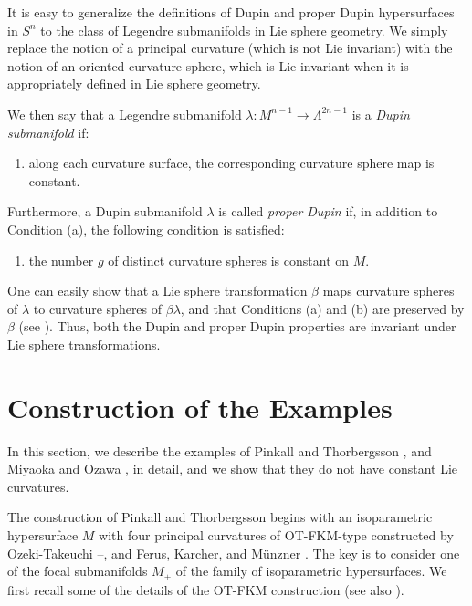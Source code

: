 \documentclass[12pt]{article}
\begin{document}
It is easy to generalize the definitions of Dupin and proper Dupin hypersurfaces in $S^n$ to the class of Legendre submanifolds in Lie sphere geometry.  We simply replace the notion of a principal curvature (which is not Lie invariant)
with the notion of an oriented curvature sphere, which is Lie invariant when it is appropriately defined in Lie sphere geometry.

We then say that a Legendre submanifold $\lambda: M^{n-1} \rightarrow \Lambda^{2n-1}$
is a {\em Dupin submanifold} if:


\begin{enumerate}
\item[(a)] along each curvature surface, the corresponding
curvature sphere map is constant.
\end{enumerate}
Furthermore, a Dupin submanifold $\lambda$ is called {\em proper Dupin} if, in addition 
to Condition (a), the following condition is satisfied:

\begin{enumerate}
\item[(b)] the number $g$ of distinct curvature spheres is constant on $M$.
\end{enumerate}

One can easily show that a Lie sphere transformation $\beta$ maps curvature spheres of $\lambda$ to curvature
spheres of $\beta \lambda$, and that Conditions (a) and (b) are preserved by $\beta$ (see \cite[pp.67--70]{Cec1}).  
Thus, both the Dupin and proper Dupin properties are invariant under Lie sphere transformations.





\section{Construction of the Examples}
\label{sec:3.7} 
In this section, we describe the examples of Pinkall and Thorbergsson \cite{PT1}, and Miyaoka and Ozawa \cite{MO},
in detail, and we show that they do not have constant Lie curvatures.

The construction of Pinkall and Thorbergsson begins with an isoparametric hypersurface $M$
with four principal curvatures of 
OT-FKM-type constructed by Ozeki-Takeuchi \cite{OT}--\cite{OT2}, and Ferus, Karcher, and M\"{u}nzner \cite{FKM}.
The key is to consider one of the focal submanifolds $M_{+}$ of the family of isoparametric hypersurfaces.
We first recall some of the details of the OT-FKM construction (see also \cite[pp. 95--112]{Cec1}).\\
\end{document}
